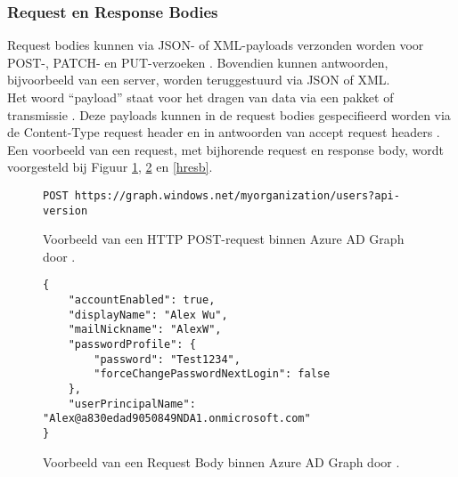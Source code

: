\subsubsection{Request en Response Bodies}


Request bodies kunnen via \Ac{JSON}- of \ac{XML}-payloads verzonden worden voor POST-, PATCH- en PUT-verzoeken \autocite{Microsoft2015}. Bovendien kunnen antwoorden, bijvoorbeeld van een server, worden teruggestuurd via \ac{JSON} of \ac{XML}. \\

Het woord “payload” staat voor het dragen van data via een pakket of transmissie \autocite{Comer2006}. Deze payloads kunnen in de request bodies gespecifieerd worden via de Content-Type request header en in antwoorden van accept request headers \autocite{Microsoft2015}. Een voorbeeld van een request, met bijhorende request en response body, wordt voorgesteld bij Figuur \ref{hpr}, \ref{hreqb} en \ref{hresb}. \\

\begin{figure}[h!]
    \scriptsize
    \begin{verbatim}
POST https://graph.windows.net/myorganization/users?api-version
    \end{verbatim}
    \caption[Voorbeeld HTTP POST-request]{Voorbeeld van een \ac{HTTP} POST-request binnen Azure \ac{AD} Graph door \textcite{Microsoft2015}.}
    \label{hpr}
\end{figure}

\begin{figure}[h!]
    \scriptsize
    \begin{verbatim}
{
    "accountEnabled": true,
    "displayName": "Alex Wu",
    "mailNickname": "AlexW",
    "passwordProfile": {
        "password": "Test1234",
        "forceChangePasswordNextLogin": false
    },
    "userPrincipalName": "Alex@a830edad9050849NDA1.onmicrosoft.com"
}
    \end{verbatim}
    \caption[Voorbeeld Request Body Azure AD Graph]{Voorbeeld van een Request Body binnen Azure \ac{AD} Graph door \textcite{Microsoft2015}.}
    \label{hreqb}
\end{figure}

